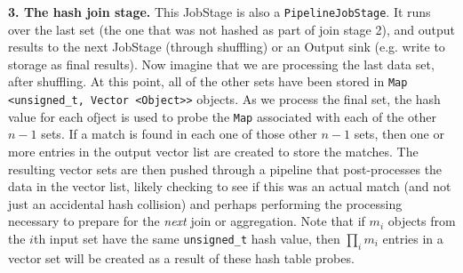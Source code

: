 \vspace{5pt}
{\bf 3. The hash join stage.} 
This JobStage is also a \texttt{PipelineJobStage}. It runs over the last set (the one that was not 
hashed as part of join stage 2), and output results to the next
JobStage (through shuffling) or an Output sink (e.g. write to storage
as final results). Now imagine that we are processing the last data set, after shuffling.  At this point,
all of the other sets have been
stored in \texttt{Map <unsigned\_t, Vector <Object>>} objects.  As we process the final set,
the hash value for each ofject is used to probe the \texttt{Map}
associated with each of the other $n-1$ sets.  If a match is found in each one of those other $n-1$ sets, then
one or more entries in the output vector list are created to store the matches.  The resulting vector sets are then pushed through a pipeline that post-processes
the data in the vector list, likely checking to see if this was an actual match (and not just an accidental hash collision) and perhaps performing the processing
necessary to prepare for the \emph{next} join or aggregation.
Note that if $m_i$ objects from the $i$th input set have the same \texttt{unsigned\_t} hash value, then $\prod_i m_i$ entries in a vector set will be created
as a result of these hash table probes. 

%
%
%
